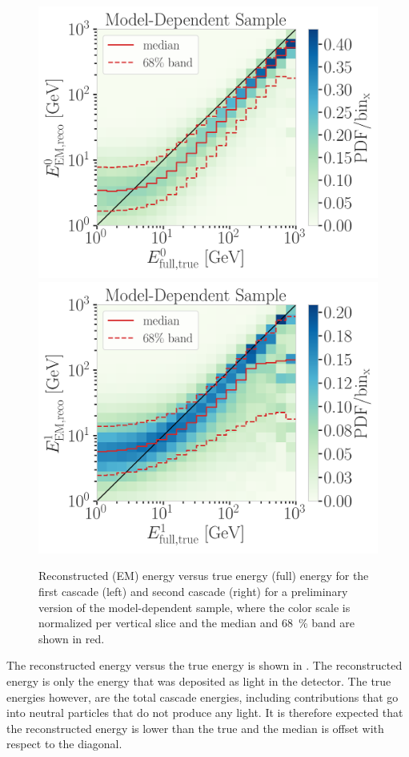 \begin{figure}[h]
	\centering
    \includegraphics[width=0.49\linewidth]{figures/results/190607/resolutions/casc0_reco_energy_vs_casc0_true_energy_final_level_good_step_contours.png}
    \includegraphics[width=0.49\linewidth]{figures/results/190607/resolutions/casc1_reco_energy_vs_casc1_true_energy_final_level_good_step_contours.png}
    \caption[Reconstructed cascade energies versus true energies - preliminary model-dependent sample]{Reconstructed (EM) energy versus true energy (full) energy for the first cascade (left) and second cascade (right) for a preliminary version of the model-dependent sample, where the color scale is normalized per vertical slice and the median and \SI{68}{\percent} band are shown in red.}
\end{figure}

The reconstructed energy versus the true energy is shown in . The reconstructed energy is only the energy that was deposited as light in the detector. The true energies however, are the total cascade energies, including contributions that go into neutral particles that do not produce any light. It is therefore expected that the reconstructed energy is lower than the true and the median is offset with respect to the diagonal.

